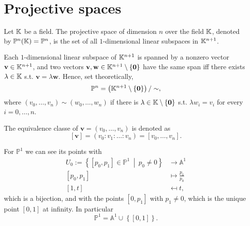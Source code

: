\section{Projective spaces}
\begin{defn}
	Let $\mathbb{K}$ be a field.
	The projective space of dimension $n$ over the field $\mathbb{K}$, denoted by $\mathbb{P}^n(\mathbb{K}) = \mathbb{P}^n$, is the set of all $1$-dimensional linear subspaces in $\mathbb{K}^{n+1}$.
\end{defn}

\begin{rem}
	Each $1$-dimensional linear subspace of $\mathbb{K}^{n+1}$ is spanned by a nonzero vector $\mathbf{v} \in \mathbb{K}^{n+1}$,
	and two vectors $\mathbf{v}, \mathbf{w} \in \mathbb{K}^{n+1} \setminus \left\{ \mathbf{0} \right\}$ have the same span iff
	there exists $\lambda \in \mathbb{K}$ s.t. $\mathbf{v} = \lambda \mathbf{w}$.
	Hence, set theoretically,
	 \begin{equation}
		 \mathbb{P}^n = \left( \mathbb{K}^{n+1} \setminus \left\{ \mathbf{0} \right\} \right)/\sim
	,\end{equation} 
	where $\left( v_0, \ldots, v_n \right) \sim \left( w_0, \ldots, w_n \right)$ if there is $\lambda \in \mathbb{K} \setminus \left\{ \mathbf{0} \right\}$ s.t. $\lambda w_i = v_i$ for every $i = 0, \ldots, n$.

	The equivalence classe of $\mathbf{v} = \left( v_0, \ldots, v_n \right)$ is denoted as
	\begin{equation}
	\left[ \mathbf{v} \right] = \left( v_0 : v_1 : \ldots : v_n \right) = \left[ v_0, \ldots, v_n \right]
	.\end{equation} 
\end{rem}

\begin{ex}
	For $\mathbb{P}^1$ we can see its points with
	\begin{align}
		U_0 := \left\{ \left[ p_0, p_1 \right] \in \mathbb{P}^1 \ \middle|\ p_0 \neq 0 \right\} &\to \mathbb{A}^1 \\
		\left[ p_0, p_1 \right] &\mapsto \frac{p_1}{p_0}\\
		\left[ 1, t \right] &\mapsfrom t
	,\end{align} 
	which is a bijection, and with the points $\left[ 0, p_1 \right]$ with $p_1 \neq 0$, which is the unique point $\left[ 0, 1 \right]$ at infinity.
	In particular 
	\begin{equation}
	\mathbb{P}^1 = \mathbb{A}^1 \cup_{} \left\{ \left[ 0, 1\right] \right\} 
	.\end{equation} 
\end{ex} 


